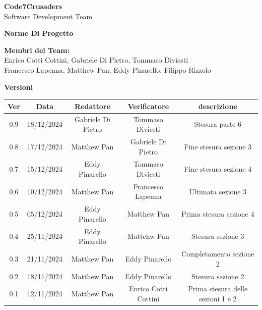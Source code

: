\documentclass{article}
\begin{document}
\begin{titlepage}
    \vspace{1cm}
    
    {\Huge \textbf{Code7Crusaders}}\\
    \vspace{0.5cm}
    {\Large Software Development Team}\\
    \vspace{2cm}
    
    \large \textbf{Norme Di Progetto}
    \vspace{3.9cm}

    \textbf{Membri del Team:}\\
    Enrico Cotti Cottini, Gabriele Di Pietro, Tommaso Diviesti \\
    Francesco Lapenna, Matthew Pan, Eddy Pinarello, Filippo Rizzolo \\
    \vspace{0.5cm}
    
    \vspace{1cm}
\end{titlepage}



\newpage
\begin{center}
    \textbf{Versioni}
    \\
    \vspace{0.3cm}
    \begin{tabular}{|c|c|c|c|c|}
        \hline
        \textbf{Ver} & \textbf{Data} & \textbf{Redattore} & \textbf{Verificatore} & \textbf{descrizione}\\
        \hline
        0.9 & 18/12/2024 & Gabriele Di Pietro & Tommaso Diviesti & Stesura parte 6 \\ 
        0.8 & 17/12/2024 & Matthew Pan &   Gabriele Di Pietro & Fine stesura sezione 3\\
        0.7 & 15/12/2024 & Eddy Pinarello & Tommaso Diviesti & Fine stesura sezione 4\\
        0.6 & 10/12/2024 & Matthew Pan & Francesco Lapenna & Ultimata sezione 3\\
        0.5 & 05/12/2024 & Eddy Pinarello & Matthew Pan       & Prima stesura sezione 4\\
        0.4 & 25/11/2024 & Eddy Pinarello & Mattehw Pan       & Stesura sezione 3\\
        0.3 & 21/11/2024 & Matthew Pan &    Eddy Pinarello    & Completamento sezione 2\\
        0.2 & 18/11/2024 & Matthew Pan &    Eddy Pinarello    & Stesura sezione 2\\
        0.1 & 12/11/2024 & Matthew Pan & Enrico Cotti Cottini & Prima stesura delle sezioni 1 e 2\\
        \hline
    \end{tabular}
\end{center}
\end{document}
